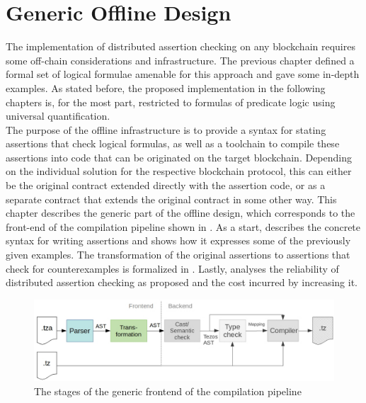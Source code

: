 

\chapter{Generic Offline Design}\label{chap:offline}
The implementation of distributed assertion checking on any blockchain requires some off-chain considerations and infrastructure. The previous chapter defined a formal set of logical formulae amenable for this approach and gave some in-depth examples. As stated before, the proposed implementation in the following chapters is, for the most part, restricted to formulas of predicate logic using universal quantification.\\
The purpose of the offline infrastructure is to provide a syntax for stating assertions that check logical formulas, as well as a toolchain to compile these assertions into code that can be originated on the target blockchain. Depending on the individual solution for the respective blockchain protocol, this can either be the original contract extended directly with the assertion code, or as a separate contract that extends the original contract in some other way. This chapter describes the generic part of the offline design, which corresponds to the front-end of the compilation pipeline shown in . As a start,  describes the concrete syntax for writing assertions and shows how it expresses some of the previously given examples. The transformation of the original assertions to assertions that check for counterexamples is formalized in . Lastly,  analyses the reliability of distributed assertion checking as proposed and the cost incurred by increasing it.

\begin{figure}[h]
\includegraphics[width=\linewidth]{figures/3-offline/pipeline_frontend}
\caption{The stages of the generic frontend of the compilation pipeline}
\label{fig:pipeline_frontend}
\end{figure}

